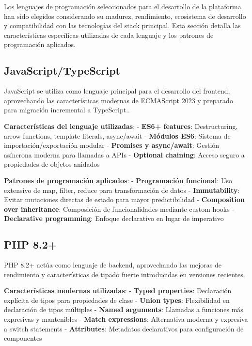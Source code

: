 \documentclass[12pt,a4paper,oneside]{report}
\begin{document}
Los lenguajes de programación seleccionados para el desarrollo de la
plataforma han sido elegidos considerando su madurez, rendimiento,
ecosistema de desarrollo y compatibilidad con las tecnologías del stack
principal. Esta sección detalla las características específicas
utilizadas de cada lenguaje y los patrones de programación aplicados.

\subsection{JavaScript/TypeScript}\label{javascripttypescript}

JavaScript se utiliza como lenguaje principal para el desarrollo del
frontend, aprovechando las características modernas de ECMAScript 2023 y
preparado para migración incremental a TypeScript..

\textbf{Características del lenguaje utilizadas}: - \textbf{ES6+
features}: Destructuring, arrow functions, template literals,
async/await - \textbf{Módulos ES6}: Sistema de importación/exportación
modular - \textbf{Promises y async/await}: Gestión asíncrona moderna
para llamadas a APIs - \textbf{Optional chaining}: Acceso seguro a
propiedades de objetos anidados

\textbf{Patrones de programación aplicados}: - \textbf{Programación
funcional}: Uso extensivo de map, filter, reduce para transformación de
datos - \textbf{Immutability}: Evitar mutaciones directas de estado para
mayor predictibilidad - \textbf{Composition over inheritance}:
Composición de funcionalidades mediante custom hooks -
\textbf{Declarative programming}: Enfoque declarativo en lugar de
imperativo

\subsection{PHP 8.2+}\label{php-8.2}

PHP 8.2+ actúa como lenguaje de backend, aprovechando las mejoras de
rendimiento y características de tipado fuerte introducidas en versiones
recientes.

\textbf{Características modernas utilizadas}: - \textbf{Typed
properties}: Declaración explícita de tipos para propiedades de clase -
\textbf{Union types}: Flexibilidad en declaración de tipos múltiples -
\textbf{Named arguments}: Llamadas a funciones más expresivas y
mantenibles - \textbf{Match expressions}: Alternativa moderna y
expresiva a switch statements - \textbf{Attributes}: Metadatos
declarativos para configuración de componentes
\end{document}
